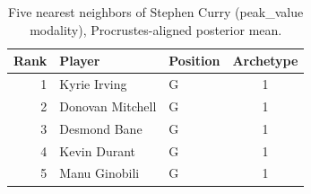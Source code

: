 \begin{table}[htbp]
  \centering\small
  \begin{tabular}{rllc}
    \toprule
    Rank & Player & Position & Archetype \\
    \midrule
    1 & Kyrie Irving & G & 1 \\
    2 & Donovan Mitchell & G & 1 \\
    3 & Desmond Bane & G & 1 \\
    4 & Kevin Durant & G & 1 \\
    5 & Manu Ginobili & G & 1 \\
    \bottomrule
  \end{tabular}
  \caption{Five nearest neighbors of Stephen Curry (peak_value modality), Procrustes-aligned posterior mean.}
  \label{tab:Stephen_Curry_neighbors_peak_value}
\end{table}

